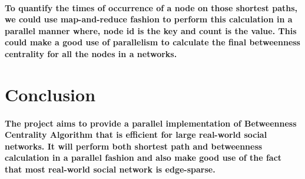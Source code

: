 \documentclass{article}
\begin{document}
\paragraph{
To quantify the times of occurrence of a node on those shortest paths, we could use map-and-reduce fashion to perform this calculation in a parallel manner where, node id is the key and count is the value. This could make a good use of parallelism to calculate the final betweenness centrality for all the nodes in a networks.
}
\section{Conclusion}
\paragraph{
The project aims to provide a parallel implementation of Betweenness Centrality Algorithm that is efficient for large real-world social networks. It will perform both shortest path and betweenness calculation in a parallel fashion and also make good use of the fact that most real-world social network is edge-sparse. 
}
\newpage
 
 
\end{document}
